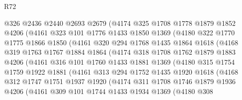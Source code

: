 \begin{lexlean}{R72}
\begin{coremodule}
            @326
            @2436
            @2440
            @2693
            @2679
            (@4174
              @325
              @1708
              @1778
              @1879
              @1852
              @4206
              (@4161
                @323
                @101
                @1776
                @1433
                @1850
                @1369
                (@4180
                  @322
                  @1770
                  @1775
                  @1866
                  @1850
                  (@4161
                    @320
                    @294
                    @1768
                    @1435
                    @1864
                    @1618
                    (@4168
                      @319
                      @1763
                      @1767
                      @1884
                      @1864
                      (@4174
                        @318
                        @1708
                        @1762
                        @1879
                        @1883
                        @4206
                        (@4161
                          @316
                          @101
                          @1760
                          @1433
                          @1881
                          @1369
                          (@4180
                            @315
                            @1754
                            @1759
                            @1922
                            @1881
                            (@4161
                              @313
                              @294
                              @1752
                              @1435
                              @1920
                              @1618
                              (@4168
                                @312
                                @1747
                                @1751
                                @1937
                                @1920
                                (@4174
                                  @311
                                  @1708
                                  @1746
                                  @1879
                                  @1936
                                  @4206
                                  (@4161
                                    @309
                                    @101
                                    @1744
                                    @1433
                                    @1934
                                    @1369
                                    (@4180
                                      @308

\end{coremodule}
\end{lexlean}
